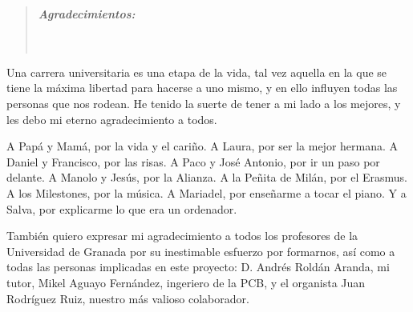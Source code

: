 \cleardoublepage
{}
{}

\vspace*{2.5cm}


\begin{quotation}
\noindent \begin{center}
\textbf{\emph{\Large Agradecimientos:}}\textbf{\emph{\large }}\\
\textbf{\emph{\large }}\\
\textbf{\emph{\large }}\\
\textbf{\emph{\large }}
\par\end{center}{\large \par}
\end{quotation}

\begin{onehalfspace}

Una carrera universitaria es una etapa de la vida, tal vez aquella en la que se tiene la máxima libertad para hacerse a uno mismo, y en ello influyen todas las personas que nos rodean. He tenido la suerte de tener a mi lado a los mejores, y les debo mi eterno agradecimiento a todos.

A Papá y Mamá, por la vida y el cariño. A Laura, por ser la mejor hermana. A Daniel y Francisco, por las risas. A Paco y José Antonio, por ir un paso por delante. A Manolo y Jesús, por la Alianza. A la Peñita de Milán, por el Erasmus. A los Milestones, por la música. A Mariadel, por enseñarme a tocar el piano. Y a Salva, por explicarme lo que era un ordenador.

También quiero expresar mi agradecimiento a todos los profesores de la Universidad de Granada por su inestimable esfuerzo por formarnos, así como a todas las personas implicadas en este proyecto: D. Andrés Roldán Aranda, mi tutor, Mikel Aguayo Fernández, ingeriero de la PCB, y el organista Juan Rodríguez Ruiz, nuestro más valioso colaborador.

\end{onehalfspace}


\clearpage{\pagestyle{empty}\cleardoublepage}%
